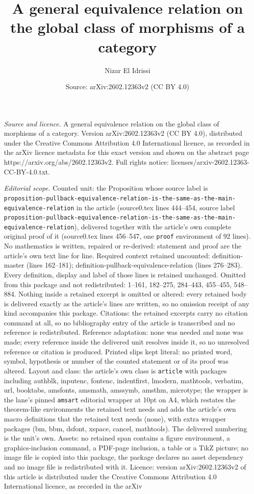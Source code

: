 \documentclass[10pt,a4paper]{amsart}
\title[A general equivalence relation on the global class of morphi]{A general equivalence relation on the global class of morphisms of a category}
\author{Nizar El Idrissi}
\date{Source: arXiv:2602.12363v2 (CC BY 4.0)}
\begin{document}
\maketitle

\noindent\emph{Source and licence.} A general equivalence relation on the global class of morphisms of a category. Version arXiv:2602.12363v2 (CC BY 4.0), distributed under the Creative Commons Attribution 4.0 International licence, as recorded in the arXiv licence metadata for this exact version and shown on the abstract page https://arxiv.org/abs/2602.12363v2. Full rights notice: licenses/arxiv-2602.12363-CC-BY-4.0.txt.\par\smallskip

\noindent\textit{Editorial scope.} Counted unit: the Proposition whose source label is \texttt{proposition-pullback-equivalence-relation-is-the-same-as-the-main-equivalence-relation} in the article (source0.tex lines 444--454, source label \texttt{proposition-pullback-equivalence-relation-is-the-same-as-the-main-equivalence-relation}), delivered together with the article's own complete original proof of it (source0.tex lines 456--547, one \texttt{proof} environment of 92 lines). No mathematics is written, repaired or re-derived: statement and proof are the article's own text line for line. Required context retained uncounted: definition-master (lines 162--181); definition-pullback-equivalence-relation (lines 276--283). Every definition, display and label of those lines is retained unchanged. Omitted from this package and not redistributed: 1--161, 182--275, 284--443, 455--455, 548--884. Nothing inside a retained excerpt is omitted or altered: every retained body is delivered exactly as the article's lines are written, so no omission receipt of any kind accompanies this package. Citations: the retained excerpts carry no citation command at all, so no bibliography entry of the article is transcribed and no reference is redistributed. Reference adaptation: none was needed and none was made; every reference inside the delivered unit resolves inside it, so no unresolved reference or citation is produced. Printed slips kept literal: no printed word, symbol, hypothesis or number of the counted statement or of its proof was altered. Layout and class: the article's own class is \texttt{article} with packages including authblk, inputenc, fontenc, indentfirst, lmodern, mathtools, verbatim, url, booktabs, amsfonts, amsmath, amssymb, amsthm, microtype; the wrapper is the lane's pinned \texttt{amsart} editorial wrapper at 10pt on A4, which restates the theorem-like environments the retained text needs and adds the article's own macro definitions that the retained text needs (none), with extra wrapper packages (bm, bbm, dsfont, xspace, cancel, mathtools). The delivered numbering is the unit's own. Assets: no retained span contains a figure environment, a graphics-inclusion command, a PDF-page inclusion, a table or a TikZ picture; no image file is copied into this package, the package declares no asset dependency and no image file is redistributed with it. Licence: version arXiv:2602.12363v2 of this article is distributed under the Creative Commons Attribution 4.0 International licence, as recorded in the arXiv 
\end{document}
